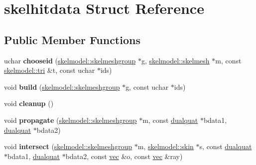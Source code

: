 \hypertarget{structskelhitdata}{}\section{skelhitdata Struct Reference}
\label{structskelhitdata}
\subsection*{Public Member Functions}
\begin{DoxyCompactItemize}
\item 
\mbox{\label{structskelhitdata_a9aa3cb408c77d93fd09509a57f91bf7a}} 
uchar {\bfseries chooseid} (\hyperlink{structskelmodel_1_1skelmeshgroup}{skelmodel\+::skelmeshgroup} $\ast$g, \hyperlink{structskelmodel_1_1skelmesh}{skelmodel\+::skelmesh} $\ast$m, const \hyperlink{structskelmodel_1_1tri}{skelmodel\+::tri} \&t, const uchar $\ast$ids)
\item 
\mbox{\label{structskelhitdata_a8b57ef65bd21a12644f33351f89b36b2}} 
void {\bfseries build} (\hyperlink{structskelmodel_1_1skelmeshgroup}{skelmodel\+::skelmeshgroup} $\ast$g, const uchar $\ast$ids)
\item 
\mbox{\label{structskelhitdata_a49415132d8cea3b1796e9ca8eb55df9a}} 
void {\bfseries cleanup} ()
\item 
\mbox{\label{structskelhitdata_a970a7225e0dd8ee8d304f9341f5c2aef}} 
void {\bfseries propagate} (\hyperlink{structskelmodel_1_1skelmeshgroup}{skelmodel\+::skelmeshgroup} $\ast$m, const \hyperlink{structdualquat}{dualquat} $\ast$bdata1, \hyperlink{structdualquat}{dualquat} $\ast$bdata2)
\item 
\mbox{\label{structskelhitdata_ae3370dd9c55e6cc4b11c79d77a4eef3d}} 
void {\bfseries intersect} (\hyperlink{structskelmodel_1_1skelmeshgroup}{skelmodel\+::skelmeshgroup} $\ast$m, \hyperlink{structanimmodel_1_1skin}{skelmodel\+::skin} $\ast$s, const \hyperlink{structdualquat}{dualquat} $\ast$bdata1, \hyperlink{structdualquat}{dualquat} $\ast$bdata2, const \hyperlink{structvec}{vec} \&o, const \hyperlink{structvec}{vec} \&ray)
\end{DoxyCompactItemize}

